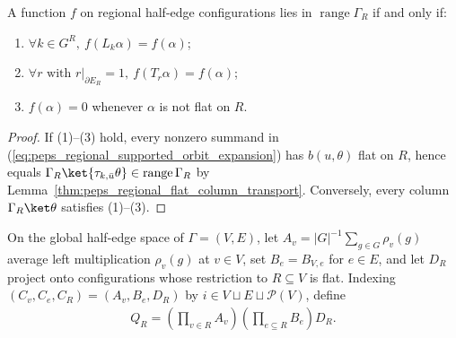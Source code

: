 \begin{lemma}%
    \label{thm:peps_regional_range_invariant_flat}
    \leanok
    A function $f$ on regional half-edge configurations lies in $\operatorname{range}\Gamma_R$ if and only if:
    \begin{enumerate}
        \item $\forall k\in G^R,\ f(L_k\alpha)=f(\alpha)$;
        \item $\forall r\text{ with }r|_{\partial E_R}=1,\ f(T_r\alpha)=f(\alpha)$;
        \item $f(\alpha)=0$ whenever $\alpha$ is not flat on $R$.
    \end{enumerate}
\end{lemma}
\begin{proof}\leanok
    If (1)--(3) hold, every nonzero summand in (\ref{eq:peps_regional_supported_orbit_expansion}) has $b(u,\theta)$ flat on $R$, hence equals $\Gamma_R\ket{\tau_{k,\bar u}\theta}\in\operatorname{range}\Gamma_R$ by Lemma~\ref{thm:peps_regional_flat_column_transport}. Conversely, every column $\Gamma_R\ket\theta$ satisfies (1)--(3).
\end{proof}

\begin{definition}%
    \label{def:peps_ambient_regional_constraints}
    \leanok
    On the global half-edge space of $\Gamma=(V,E)$, let $A_v=|G|^{-1}\sum_{g\in G}\rho_v(g)$ average left multiplication $\rho_v(g)$ at $v\in V$, set $B_e=B_{V,e}$ for $e\in E$, and let $D_R$ project onto configurations whose restriction to $R\subseteq V$ is flat. Indexing $(C_v,C_e,C_R)=(A_v,B_e,D_R)$ by $i\in V\sqcup E\sqcup\mathcal P(V)$, define
    \begin{align}
        Q_R=\left(\prod_{v\in R} A_v\right)
        \left(\prod_{e\subseteq R} B_e\right)D_R.
        \label{eq:peps_ambient_regional_constraint}
    \end{align}
\end{definition}

